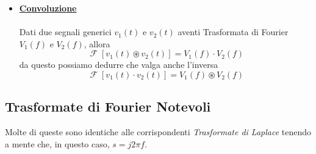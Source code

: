 \documentclass{article}
\newcommand{\Fourier}{\mathop{\mathcal{F}}}
\begin{document}
\begin{itemize}
\[					  \]
	           	\item \underline{\textbf{Convoluzione}} \\
	                  \\
	                  Dati due segnali generici $ v_1(t) \text{ e } v_2(t) $ aventi Trasformata  di Fourier $ V_1(f) \text{ e } V_2(f) $, allora
	                  \[
	                     \Fourier[v_1(t) \circledast v_2(t)] = V_1(f) \cdot V_2(f)
	                  \]
	                  da questo possiamo dedurre che valga anche l'inversa
	                  \[
	                     \Fourier[v_1(t) \cdot v_2(t)] = V_1(f) \circledast V_2(f)
	                  \]
	        \end{itemize}

		\subsection{Trasformate di Fourier Notevoli}
			Molte di queste sono identiche alle corrispondenti \textit{Trasformate di Laplace} tenendo a mente che, in questo caso, $ s=j2\pi f $.
\end{document}
